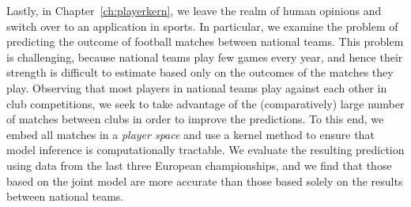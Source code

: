 Lastly, in Chapter~\ref{ch:playerkern}, we leave the realm of human opinions and switch over to an application in sports.
In particular, we examine the problem of predicting the outcome of football matches between national teams.
This problem is challenging, because national teams play few games every year, and hence their strength is difficult to estimate based only on the outcomes of the matches they play.
Observing that most players in national teams play against each other in club competitions, we seek to take advantage of the (comparatively) large number of matches between clubs in order to improve the predictions.
To this end, we embed all matches in a \emph{player space} and use a kernel method to ensure that model inference is computationally tractable.
We evaluate the resulting prediction using data from the last three European championships, and we find that those based on the joint model are more accurate than those based solely on the results between national teams.

